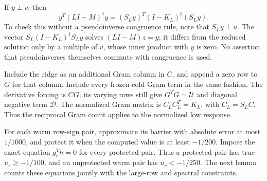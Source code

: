 \documentclass[11pt]{amsart}
\theoremstyle{remark}\newtheorem{remark}[theorem]{Remark}
\begin{document}
If $y\perp v$, then
\begin{equation}\label{eq:genresponse}
 y^T(LI-M)^\dagger y
 =(S_Ly)^T(I-K_L)^\dagger(S_Ly).
\end{equation}
To check this without a pseudoinverse congruence rule, note that
$S_Ly\perp u$. The vector
$S_L(I-K_L)^\dagger S_Ly$ solves $(LI-M)z=y$; it differs from the reduced
solution only by a multiple of $v$, whose inner product with $y$ is zero.
No assertion that pseudoinverses themselves commute with congruence is used.

Include the ridge as an additional Gram column in $C$, and append a zero
row to $G$ for that column. Include every frozen cold Gram term in the
same fashion. The derivative forcing is $CG$; its varying rows still
give $G^TG=\mathcal U$ and diagonal negative term $\mathcal D$.
The normalized Gram matrix is $C_LC_L^T=K_L$, with $C_L=S_LC$.
Thus the reciprocal Gram count applies to the normalized low response.

For each warm row-sign pair, approximate its barrier with absolute error at
most $1/1000$, and protect it when the computed value is at least $-1/200$.
Impose the exact equation $g_r^Th=0$ for every protected pair. Thus a
protected pair has true $u_r\ge-1/100$, and an unprotected warm pair has
$u_r<-1/250$. The next lemma counts these equations jointly with the
large-row and spectral constraints.
\end{document}
